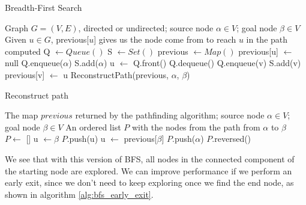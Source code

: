 \documentclass[12pt]{report}
\begin{document}
\begin{algorithm}
\caption{Breadth-First Search}
\label{alg:bfs}
\begin{algorithmic}[1]
\Require Graph $G = (V, E)$, directed or undirected; source node $\alpha \in V$; goal node $\beta \in V$
\Ensure Given $u \in G$, previous[$u$] gives us the node come from to reach $u$ in the path computed
\State Q $\gets Queue()$
\State S $\gets Set()$ 
\State previous $\gets Map()$
	\State previous[u] $\gets$ null
\EndFor
\State Q.enqueue($\alpha$)
\State S.add($\alpha$)
	\State u $\gets$ Q.front()
	\State Q.dequeue()
			\State Q.enqueue(v)
			\State S.add(v)
			\State previous[v] $\gets$ u
		\EndIf
	\EndFor
\EndWhile
\State \Return ReconstructPath(previous, $\alpha$, $\beta$)
\EndProcedure
\end{algorithmic}
\end{algorithm}

\begin{algorithm}
\caption{Reconstruct path}
\label{alg:reconstruct}
\begin{algorithmic}[1]
\Require The map $previous$ returned by the pathfinding algorithm; source node $\alpha \in V$; goal node $\beta \in V$
\Ensure An ordered list $P$ with the nodes from the path from $\alpha$ to $\beta$
\State $P \gets$ []  
\State u $\gets \beta$
	\State $P$.push(u)
	\State u $\gets$ previous[$\beta$]
\EndWhile
\State $P$.push($\alpha$)
\State \Return $P$.reversed()
\EndProcedure
\end{algorithmic}
\end{algorithm}

We see that with this version of BFS, all nodes in the connected component of the starting node are explored. We can improve performance if we perform an early exit, since we don't need to keep exploring once we find the end node, as shown in algorithm \ref{alg:bfs_early_exit}.
\end{document}
